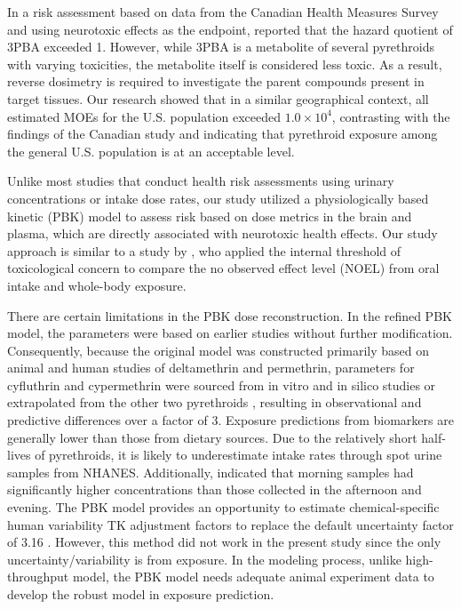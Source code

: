\documentclass[toxics,article,submit,pdftex,moreauthors]{Definitions/mdpi}
\begin{document}
In a risk assessment based on data from the Canadian Health Measures
Survey and using neurotoxic effects as the endpoint,
\citet{faure_evaluation_2020} reported that the hazard quotient of 3PBA
exceeded 1. However, while 3PBA is a metabolite of several pyrethroids
with varying toxicities, the metabolite itself is considered less toxic.
As a result, reverse dosimetry is required to investigate the parent
compounds present in target tissues. Our research showed that in a
similar geographical context, all estimated MOEs for the U.S. population
exceeded \(1.0 \times 10^{4}\), contrasting with the findings of the
Canadian study and indicating that pyrethroid exposure among the general
U.S. population is at an acceptable level.

Unlike most studies that conduct health risk assessments using urinary
concentrations or intake dose rates, our study utilized a
physiologically based kinetic (PBK) model to assess risk based on dose
metrics in the brain and plasma, which are directly associated with
neurotoxic health effects. Our study approach is similar to a study by
\citet{arnot_developing_2022}, who applied the internal threshold of
toxicological concern to compare the no observed effect level (NOEL)
from oral intake and whole-body exposure.

There are certain limitations in the PBK dose reconstruction. In the
refined PBK model, the parameters were based on earlier studies without
further modification. Consequently, because the original model was
constructed primarily based on animal and human studies of deltamethrin
and permethrin, parameters for cyfluthrin and cypermethrin were sourced
from in vitro and in silico studies or extrapolated from the other two
pyrethroids \citep{quindroit2019estimating}, resulting in observational
and predictive differences over a factor of 3. Exposure predictions from
biomarkers are generally lower than those from dietary sources. Due to
the relatively short half-lives of pyrethroids, it is likely to
underestimate intake rates through spot urine samples from NHANES.
Additionally, \citet{barr2010urinary} indicated that morning samples had
significantly higher concentrations than those collected in the
afternoon and evening. The PBK model provides an opportunity to estimate
chemical-specific human variability TK adjustment factors to replace the
default uncertainty factor of 3.16 \citep{chiu_advancing_2018}. However,
this method did not work in the present study since the only
uncertainty/variability is from exposure. In the modeling process,
unlike high-throughput model, the PBK model needs adequate animal
experiment data to develop the robust model in exposure prediction.
\end{document}
